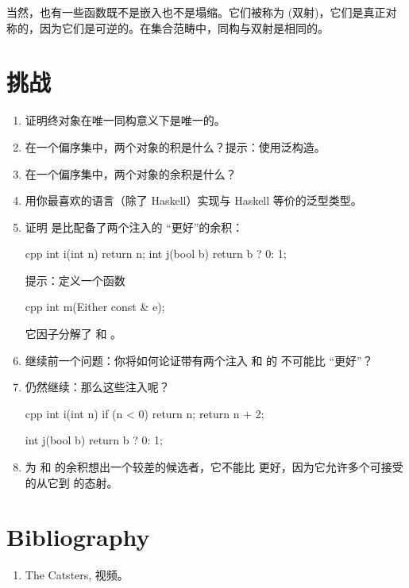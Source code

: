 当然，也有一些函数既不是嵌入也不是塌缩。它们被称为  (双射)，它们是真正对称的，因为它们是可逆的。在集合范畴中，同构与双射是相同的。

\section{挑战}

\begin{enumerate}
  \tightlist
  \item
        证明终对象在唯一同构意义下是唯一的。
  \item
        在一个偏序集中，两个对象的积是什么？提示：使用泛构造。
  \item
        在一个偏序集中，两个对象的余积是什么？
  \item
        用你最喜欢的语言（除了 Haskell）实现与 Haskell  等价的泛型类型。
  \item
        证明  是比配备了两个注入的  “更好”的余积：

        \begin{snip}{cpp}
int i(int n) { return n; }
int j(bool b) { return b ? 0: 1; }
\end{snip}

        提示：定义一个函数

        \begin{snip}{cpp}
int m(Either const & e);
\end{snip}

        它因子分解了  和 。
  \item
        继续前一个问题：你将如何论证带有两个注入  和  的  不可能比  “更好”？
  \item
        仍然继续：那么这些注入呢？

        \begin{snip}{cpp}
int i(int n) {
    if (n < 0) return n;
    return n + 2;
}

int j(bool b) { return b ? 0: 1; }
\end{snip}
  \item
        为  和  的余积想出一个较差的候选者，它不能比  更好，因为它允许多个可接受的从它到  的态射。
\end{enumerate}

\section{Bibliography}

\begin{enumerate}
  \tightlist
  \item
        The Catsters,
         视频。
\end{enumerate}